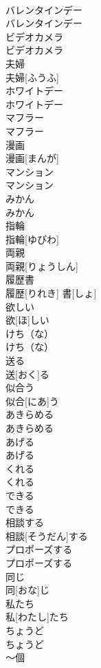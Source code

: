 \documentclass[8pt]{extreport}
\begin{document}
\begin{CJK}{UTF8}{min}
\\	バレンタインデー	
\\	バレンタインデー
\\	ビデオカメラ	
\\	ビデオカメラ
\\	夫婦	
\\	夫婦[ふうふ]
\\	ホワイトデー	
\\	ホワイトデー
\\	マフラー	
\\	マフラー
\\	漫画	
\\	漫画[まんが]
\\	マンション	
\\	マンション
\\	みかん	
\\	みかん
\\	指輪	
\\	指輪[ゆびわ]
\\	両親	
\\	両親[りょうしん]
\\	履歴書	
\\	履歴[りれき] 書[しょ]
\\	欲しい	
\\	欲[ほ]しい
\\	けち（な）	
\\	けち（な）
\\	送る	
\\	送[おく]る
\\	似合う	
\\	似合[にあ]う
\\	あきらめる	
\\	あきらめる
\\	あげる	
\\	あげる
\\	くれる	
\\	くれる
\\	できる	
\\	できる
\\	相談する	
\\	相談[そうだん]する
\\	プロポーズする	
\\	プロポーズする
\\	同じ	
\\	同[おな]じ
\\	私たち	
\\	私[わたし]たち
\\	ちょうど	
\\	ちょうど
\\	～個	

\end{CJK}
\end{document}
